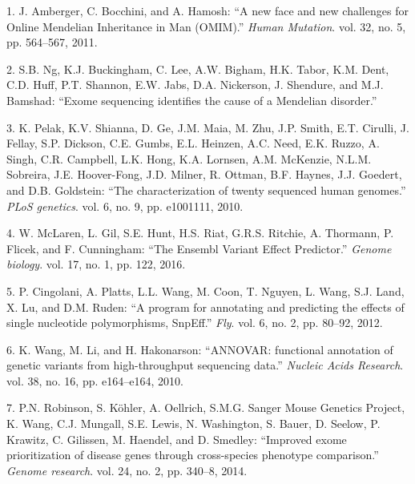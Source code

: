 \documentclass[12pt,twoside]{ugathesis}
\begin{document}
\hypertarget{refs}{}
\hypertarget{ref-Amberger2011}{}
1. J. Amberger, C. Bocchini, and A. Hamosh: ``A new face and new
challenges for Online Mendelian Inheritance in Man (OMIM).'' \emph{Human
Mutation}. vol. 32, no. 5, pp. 564--567, 2011.

\hypertarget{ref-Ng}{}
2. S.B. Ng, K.J. Buckingham, C. Lee, A.W. Bigham, H.K. Tabor, K.M. Dent,
C.D. Huff, P.T. Shannon, E.W. Jabs, D.A. Nickerson, J. Shendure, and
M.J. Bamshad: ``Exome sequencing identifies the cause of a Mendelian
disorder.''

\hypertarget{ref-Pelak2010}{}
3. K. Pelak, K.V. Shianna, D. Ge, J.M. Maia, M. Zhu, J.P. Smith, E.T.
Cirulli, J. Fellay, S.P. Dickson, C.E. Gumbs, E.L. Heinzen, A.C. Need,
E.K. Ruzzo, A. Singh, C.R. Campbell, L.K. Hong, K.A. Lornsen, A.M.
McKenzie, N.L.M. Sobreira, J.E. Hoover-Fong, J.D. Milner, R. Ottman,
B.F. Haynes, J.J. Goedert, and D.B. Goldstein: ``The characterization of
twenty sequenced human genomes.'' \emph{PLoS genetics}. vol. 6, no. 9,
pp. e1001111, 2010.

\hypertarget{ref-McLaren2016}{}
4. W. McLaren, L. Gil, S.E. Hunt, H.S. Riat, G.R.S. Ritchie, A.
Thormann, P. Flicek, and F. Cunningham: ``The Ensembl Variant Effect
Predictor.'' \emph{Genome biology}. vol. 17, no. 1, pp. 122, 2016.

\hypertarget{ref-Cingolani2012}{}
5. P. Cingolani, A. Platts, L.L. Wang, M. Coon, T. Nguyen, L. Wang, S.J.
Land, X. Lu, and D.M. Ruden: ``A program for annotating and predicting
the effects of single nucleotide polymorphisms, SnpEff.'' \emph{Fly}.
vol. 6, no. 2, pp. 80--92, 2012.

\hypertarget{ref-Wang2010}{}
6. K. Wang, M. Li, and H. Hakonarson: ``ANNOVAR: functional annotation
of genetic variants from high-throughput sequencing data.''
\emph{Nucleic Acids Research}. vol. 38, no. 16, pp. e164--e164, 2010.

\hypertarget{ref-Robinson2014}{}
7. P.N. Robinson, S. Köhler, A. Oellrich, S.M.G. Sanger Mouse Genetics
Project, K. Wang, C.J. Mungall, S.E. Lewis, N. Washington, S. Bauer, D.
Seelow, P. Krawitz, C. Gilissen, M. Haendel, and D. Smedley: ``Improved
exome prioritization of disease genes through cross-species phenotype
comparison.'' \emph{Genome research}. vol. 24, no. 2, pp. 340--8, 2014.
\end{document}
